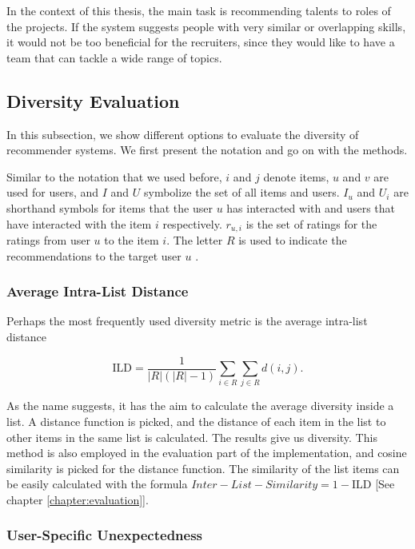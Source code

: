 In the context of this thesis, the main task is recommending talents to roles of the projects. If the system suggests people with very similar or overlapping skills, it would not be too beneficial for the recruiters, since they would like to have a team that can tackle a wide range of topics.

\subsection{Diversity Evaluation}

In this subsection, we show different options to evaluate the diversity of recommender systems. We first present the notation and go on with the methods.

Similar to the notation that we used before, $i$ and $j$ denote items, $u$ and $v$ are used for users, and $I$ and $U$ symbolize the set of all items and users. $I_u$ and $U_i$ are shorthand symbols for items that the user $u$ has interacted with and users that have interacted with the item $i$ respectively. $r_{u, i}$ is the set of ratings for the ratings from user $u$ to the item $i$. The letter $R$ is used to indicate the recommendations to the target user $u$ \cite{castells2015novelty}.

\subsubsection{Average Intra-List Distance}

Perhaps the most frequently used diversity metric is the average intra-list distance \cite{castells2015novelty}

\begin{equation}
\mathrm { ILD } = \frac { 1 } { | R | ( | R | - 1 ) } \sum _ { i \in R } \sum _ { j \in R } d ( i , j ) .
\label{eq:ild}
\end{equation}

As the name suggests, it has the aim to calculate the average diversity inside a list. A distance function is picked, and the distance of each item in the list to other items in the same list is calculated. The results give us diversity. This method is also employed in the evaluation part of the implementation, and cosine similarity is picked for the distance function. The similarity of the list items can be easily calculated with the formula $Inter-List-Similarity = 1 - \mathrm {ILD}$ [See chapter \ref{chapter:evaluation}].


\subsubsection{User-Specific Unexpectedness}\label{research-unexp}

